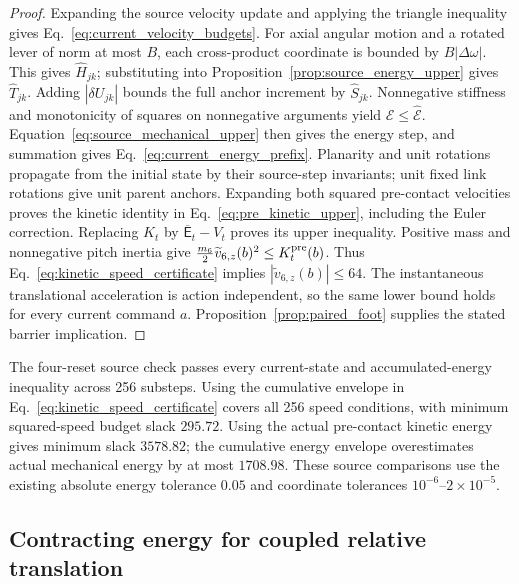 \begin{proof}
Expanding the source velocity update and applying the triangle inequality gives Eq.~\eqref{eq:current_velocity_budgets}.
For axial angular motion and a rotated lever of norm at most $B$, each cross-product coordinate is bounded by $B|\Delta\omega|$.
This gives $\widehat H_{jk}$; substituting into Proposition~\ref{prop:source_energy_upper} gives $\widehat T_{jk}$.
Adding $|\delta U_{jk}|$ bounds the full anchor increment by $\widehat S_{jk}$.
Nonnegative stiffness and monotonicity of squares on nonnegative arguments yield $\mathcal E\le\widehat{\mathcal E}$.
Equation~\eqref{eq:source_mechanical_upper} then gives the energy step, and summation gives Eq.~\eqref{eq:current_energy_prefix}.
Planarity and unit rotations propagate from the initial state by their source-step invariants; unit fixed link rotations give unit parent anchors.
Expanding both squared pre-contact velocities proves the kinetic identity in Eq.~\eqref{eq:pre_kinetic_upper}, including the Euler correction.
Replacing $K_t$ by $\overline{\mathsf E}_t-V_t$ proves its upper inequality.
Positive mass and nonnegative pitch inertia give $\tfrac{m_6}{2}\widetilde v_{6,z}(b)^2\le K_t^{\rm pre}(b)$.
Thus Eq.~\eqref{eq:kinetic_speed_certificate} implies $|\widetilde v_{6,z}(b)|\le64$.
The instantaneous translational acceleration is action independent, so the same lower bound holds for every current command $a$.
Proposition~\ref{prop:paired_foot} supplies the stated barrier implication.
\end{proof}

The four-reset source check passes every current-state and accumulated-energy inequality across 256 substeps.
Using the cumulative envelope in Eq.~\eqref{eq:kinetic_speed_certificate} covers all 256 speed conditions, with minimum squared-speed budget slack $295.72$.
Using the actual pre-contact kinetic energy gives minimum slack $3578.82$; the cumulative energy envelope overestimates actual mechanical energy by at most $1708.98$.
These source comparisons use the existing absolute energy tolerance $0.05$ and coordinate tolerances $10^{-6}$--$2\times10^{-5}$.

\subsection{Contracting energy for coupled relative translation}
\label{app:transient_lyapunov}


